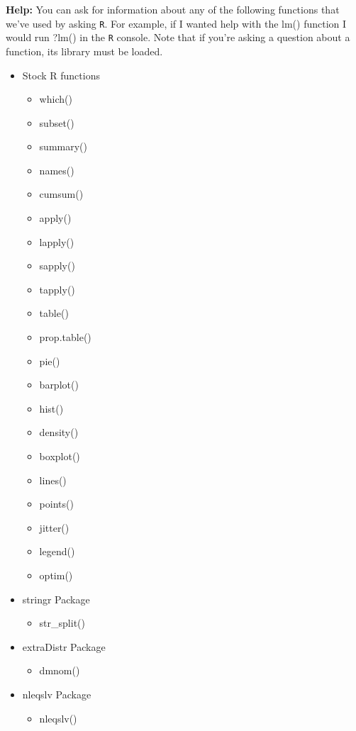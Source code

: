 \documentclass{article}
\begin{document}
\textbf{Help:}
You can ask for information about any of the following functions that we've used by
asking \texttt{R}. For example, if I wanted help with the lm() function I would 
run ?lm() in the \texttt{R} console. Note that if you're asking a question about 
a function, its library must be loaded.\\
\begin{multicols}{2} \small
\begin{itemize}
  \item Stock R functions
  \begin{itemize}
    \item which()
    \item subset()
    \item summary()
    \item names()
    \item cumsum()
    \item apply()
    \item lapply()
    \item sapply()
    \item tapply()
    \item table()
    \item prop.table()
    \item pie()
    \item barplot()
    \item hist()
    \item density()
    \item boxplot()
    \item lines()
    \item points()
    \item jitter()
    \item legend()
    \item optim()
  \end{itemize}
    \item stringr Package
  \begin{itemize}
    \item str\_split()
  \end{itemize}
    \item extraDistr Package
  \begin{itemize}
    \item dmnom()
  \end{itemize}
    \item nleqslv Package
  \begin{itemize}
    \item nleqslv()
  \end{itemize}

\end{itemize}
\end{multicols}
\end{document}
